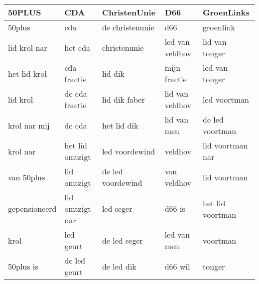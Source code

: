 \begin{tabular}{lllll}
\toprule
        50PLUS &              CDA &       ChristenUnie &              D66 &        GroenLinks \\
\midrule
        50plus &              cda &    de christenunie &              d66 &         groenlink \\
  lid krol nar &          het cda &       christenunie &  led van veldhov &    lid van tonger \\
  het lid krol &      cda fractie &            lid dik &     mijn fractie &    led van tonger \\
      lid krol &   de cda fractie &      lid dik faber &  lid van veldhov &      led voortman \\
  krol nar mij &           de cda &        het lid dik &      lid van men &   de led voortman \\
      krol nar &  het lid omtzigt &     led voordewind &          veldhov &  lid voortman nar \\
    van 50plus &      lid omtzigt &  de led voordewind &      van veldhov &      lid voortman \\
 gepensioneerd &  lid omtzigt nar &          led seger &           d66 is &  het lid voortman \\
          krol &        led geurt &       de led seger &      led van men &          voortman \\
     50plus is &     de led geurt &         de led dik &          d66 wil &            tonger \\
\bottomrule
\end{tabular}
